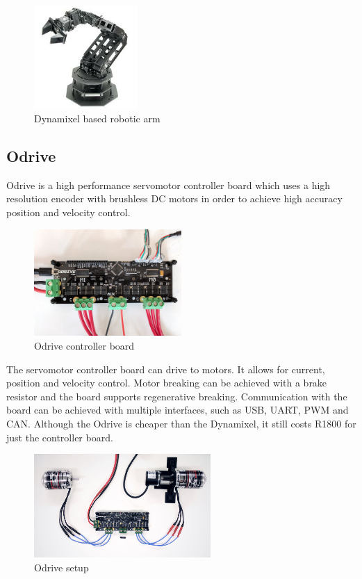 \begin{figure}[H]
\centering
\includegraphics[width=0.35\textwidth]{Dynamixel_app.jpg}
\caption{Dynamixel based robotic arm  \cite{Dynamixel}}
\end{figure}


\newpage
\subsection{Odrive}
Odrive is a high performance servomotor controller board which uses a high resolution encoder with brushless DC motors in order to achieve  high accuracy position and velocity control. \newline

\begin{figure}[H]
\centering
\includegraphics[width=0.5\textwidth]{odrive_board.jpg}
\caption{Odrive controller board\cite{Odrive}}
\end{figure}

The servomotor controller board can drive to motors. It allows for current, position and velocity control. Motor breaking can be achieved with a brake resistor and the board supports regenerative breaking. Communication with the board can be achieved with multiple interfaces, such as USB, UART, PWM and CAN. Although the Odrive is cheaper than the Dynamixel, it still costs R1800 for just the controller board.

\begin{figure}[H]
\centering
\includegraphics[width=0.6\textwidth]{Odrive.jpg}
\caption{Odrive setup\cite{Odrive}}
\end{figure}

